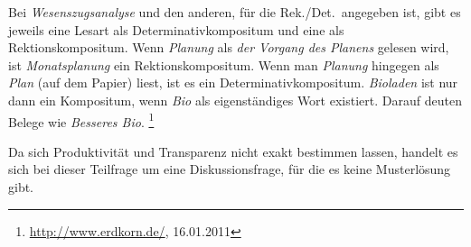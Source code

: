 Bei \textit{Wesenszugsanalyse} und den anderen, für die Rek./Det.\ angegeben ist, gibt es jeweils eine Lesart als Determinativkompositum und eine als Rektionskompositum.
Wenn \zB \textit{Planung} als \textit{der Vorgang des Planens} gelesen wird, ist \textit{Monatsplanung} ein Rektionskompositum.
Wenn man \textit{Planung} hingegen als \textit{Plan} (\zB auf dem Papier) liest, ist es ein Determinativkompositum.
\textit{Bioladen} ist nur dann ein Kompositum, wenn \textit{Bio} als eigenständiges Wort existiert.
Darauf deuten Belege wie \textit{Besseres Bio}.%
\footnote{\raggedright{\url{http://www.erdkorn.de/}, 16.01.2011}}


Da sich Produktivität und Transparenz nicht exakt bestimmen lassen, handelt es sich bei dieser Teilfrage um eine Diskussionsfrage, für die es keine Musterlösung gibt.

\begin{center}
\end{center}


